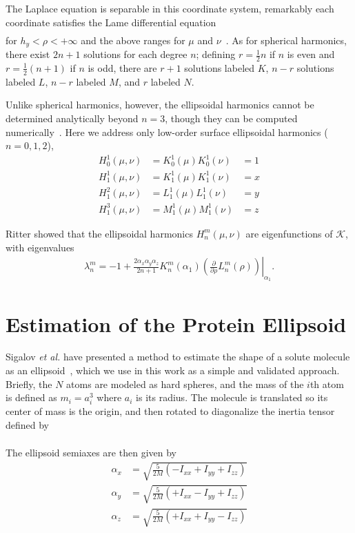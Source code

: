 The Laplace equation is separable in this coordinate system,
remarkably each coordinate satisfies the Lame differential
equation
\begin{align}
  \end{align}
for $h_y < \rho < +\infty$ and the above ranges for $\mu$ and
$\nu$~\cite{Darwin,Nevin,Hobson31,Dassios03}.  As for spherical
harmonics, there exist $2n+1$ solutions for each degree $n$; defining
$r=\frac{1}{2}n$ if $n$ is even and $r=\frac{1}{2}(n+1)$ if $n$ is
odd, there are $r+1$ solutions labeled $K$, $n-r$ solutions labeled
$L$, $n-r$ labeled $M$, and $r$ labeled $N$.  

Unlike
spherical harmonics, however, the ellipsoidal harmonics cannot be
determined analytically beyond $n=3$, though they can be computed
numerically~\cite{Ritter}.  Here we address only low-order surface
ellipsoidal harmonics ($n=0,1,2$),
\begin{align}
H_0^1(\mu,\nu)&=K_0^1(\mu)K_0^1(\nu)&=1\\
H_1^1(\mu,\nu)&=K_1^1(\mu)K_1^1(\nu)&=x\\
H_1^2(\mu,\nu)&=L_1^1(\mu)L_1^1(\nu)&=y\\
H_1^3(\mu,\nu)&=M_1^1(\mu)M_1^1(\nu)&=z
  \end{align}

Ritter showed that the ellipsoidal harmonics $H_n^m(\mu,\nu)$ are
eigenfunctions of $\mathcal{K}$, with eigenvalues
\begin{align}
  \lambda_n^m =-1 + \frac{2 \alpha_x \alpha_y \alpha_z}{2 n + 1}K_n^m(\alpha_1)\left.\left(\frac{\partial}{\partial \rho}L_n^m(\rho)\right)\right|_{\alpha_1}.
  \end{align}

\section{Estimation of the Protein Ellipsoid}
Sigalov \textit{et al.} have presented a method to estimate the shape
of a solute molecule as an ellipsoid~\cite{Sigalov06}, which we use in
this work as a simple and validated approach.  Briefly, the $N$ atoms
are modeled as hard spheres, and the mass of the $i$th atom is defined
as $m_i = a_i^3$ where $a_i$ is its radius.  The molecule is
translated so its center of mass is the origin, and then rotated to
diagonalize the inertia tensor defined by
\begin{align}
  \end{align}

The ellipsoid semiaxes are then given by
\begin{align}
  \alpha_x &= \sqrt{\frac{5}{2M}(-I_{xx}+I_{yy}+I_{zz})}\\
  \alpha_y &= \sqrt{\frac{5}{2M}(+I_{xx}-I_{yy}+I_{zz})}\\
  \alpha_z &= \sqrt{\frac{5}{2M}(+I_{xx}+I_{yy}-I_{zz})}
  \end{align}

